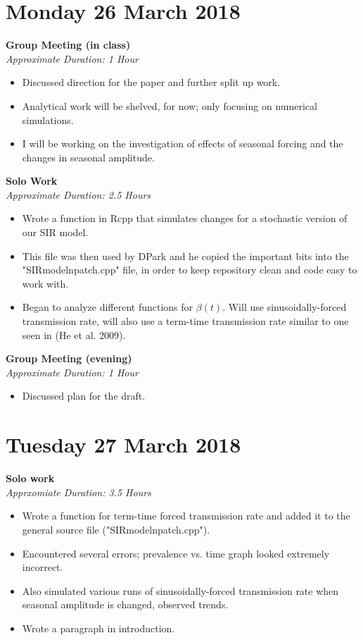 \documentclass[12pt]{article}\usepackage[]{graphicx}\usepackage[]{color}
\begin{document}
\section*{Monday 26 March 2018}

\textbf{Group Meeting (in class)} \\
\emph{Approximate Duration: 1 Hour}
\begin{itemize}
\item Discussed direction for the paper and further split up work.
\item Analytical work will be shelved, for now; only focusing on numerical simulations.
\item I will be working on the investigation of effects of seasonal forcing and the changes in seasonal amplitude.
\end{itemize}

\textbf{Solo Work} \\
\emph{Approximate Duration: 2.5 Hours}
\begin{itemize}
\item Wrote a function in Rcpp that simulates changes for a stochastic version of our SIR model.
\item This file was then used by DPark and he copied the important bits into the "SIRmodelnpatch.cpp" file, in order to keep repository clean and code easy to work with.
\item Began to analyze different functions for $\beta (t)$. Will use sinusoidally-forced transmission rate, will also use a term-time transmission rate similar to one seen in (He et al. 2009).
\end{itemize}


\textbf{Group Meeting (evening)} \\
\emph{Approximate Duration: 1 Hour}
\begin{itemize}
\item Discussed plan for the draft.
\end{itemize}

\section*{Tuesday 27 March 2018}

\textbf{Solo work} \\
\emph{Apprxomiate Duration: 3.5 Hours}
\begin{itemize}
\item Wrote a function for term-time forced transmission rate and added it to the general source file ("SIRmodelnpatch.cpp").
\item Encountered several errors; prevalence vs. time graph looked extremely incorrect.
\item Also simulated various runs of sinusoidally-forced transmission rate when seasonal amplitude is changed, observed trends.
\item Wrote a paragraph in introduction.
\end{itemize}
\end{document}
